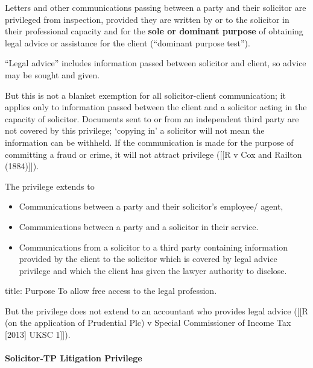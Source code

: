 \documentclass[
]{article}
\newenvironment{Shaded}{}{}
\newcommand{\NormalTok}[1]{#1}
\providecommand{\tightlist}{%
  \setlength{\itemsep}{0pt}\setlength{\parskip}{0pt}}
\begin{document}
Letters and other communications passing between a party and their
solicitor are privileged from inspection, provided they are written by
or to the solicitor in their professional capacity and for the
\textbf{sole or dominant purpose} of obtaining legal advice or
assistance for the client (``dominant purpose test'').

``Legal advice'' includes information passed between solicitor and
client, so advice may be sought and given.

But this is not a blanket exemption for all solicitor-client
communication; it applies only to information passed between the client
and a solicitor acting in the capacity of solicitor. Documents sent to
or from an independent third party are not covered by this privilege;
`copying in' a solicitor will not mean the information can be withheld.
If the communication is made for the purpose of committing a fraud or
crime, it will not attract privilege ({[}{[}R v Cox and Railton
(1884){]}{]}).

The privilege extends to

\begin{itemize}
\tightlist
\item
  Communications between a party and their solicitor's employee/ agent,
\item
  Communications between a party and a solicitor in their service.
\item
  Communications from a solicitor to a third party containing
  information provided by the client to the solicitor which is covered
  by legal advice privilege and which the client has given the lawyer
  authority to disclose.
\end{itemize}

\begin{Shaded}
\begin{Highlighting}[]
\NormalTok{title: Purpose}
\NormalTok{To allow free access to the legal profession. }
\end{Highlighting}
\end{Shaded}

But the privilege does not extend to an accountant who provides legal
advice ({[}{[}R (on the application of Prudential Plc) v Special
Commissioner of Income Tax {[}2013{]} UKSC 1{]}{]}).

\hypertarget{solicitor-tp-litigation-privilege}{%
\paragraph{Solicitor-TP Litigation
Privilege}\label{solicitor-tp-litigation-privilege}}
\end{document}
